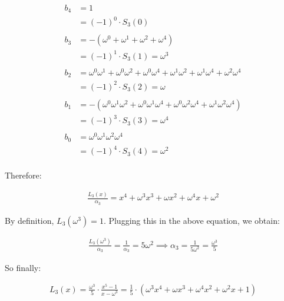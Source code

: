 \documentclass[a4paper]{article}
\begin{document}
\begin{equation}
  \begin{aligned}
    b_4 &= 1 \\
        &= (-1)^{0} \cdot S_3(0) \\
    \\
    b_3 &= -(\omega^0 + \omega^1 + \omega^2 + \omega^4) \\
        &= (-1)^{1} \cdot S_3(1) = \omega^3 \\
    \\
    b_2 &= \omega^0\omega^1 + \omega^0\omega^2 + \omega^0\omega^4 + \omega^1\omega^2 + \omega^1\omega^4 + \omega^2\omega^4 \\
        &= (-1)^{2} \cdot S_3(2) = \omega \\
    \\
    b_1 &= -(\omega^0\omega^1\omega^2 + \omega^0\omega^1\omega^4 + \omega^0\omega^2\omega^4 + \omega^1\omega^2\omega^4) \\
        &= (-1)^{3} \cdot S_3(3) = \omega^4\\
    \\
    b_0 &= \omega^0\omega^1\omega^2\omega^4 \\
        &= (-1)^{4} \cdot S_3(4) = \omega^2\\
  \end{aligned}
\end{equation}

Therefore:

\begin{equation}
  \begin{aligned}
   \frac{L_3(x)}{\alpha_3} = x^4 + \omega^3 x^3 + \omega x^2 + \omega^4 x + \omega^2
  \end{aligned}
\end{equation}

By definition, $L_3(\omega^3) = 1$. Plugging this in the above equation, we obtain:

\begin{equation}
  \begin{aligned}
   \frac{L_3(\omega^3)}{\alpha_3} = \frac{1}{\alpha_3} = 5 \omega^2 \implies \alpha_3 = \frac{1}{5 \omega^2} = \frac{\omega^3}{5}
  \end{aligned}
\end{equation}

So finally:

\begin{equation}
  \begin{aligned}
    L_3(x) = \frac{\omega^3}{5} \cdot \frac{x^5 - 1}{x - \omega^3} = \frac{1}{5} \cdot (\omega^3 x^4 + \omega x^3 + \omega^4 x^2 + \omega^2 x + 1)
  \end{aligned}
\end{equation}
\end{document}
